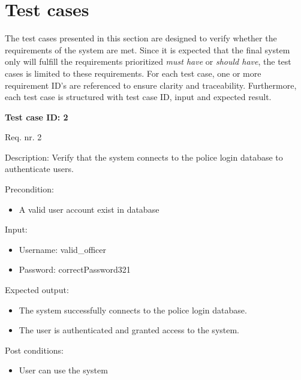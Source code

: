 \section{Test cases}
The test cases presented in this section are designed to verify whether the requirements of the system are met. Since it is expected that the final system only will fulfill the requirements prioritized \textit{must have} or \textit{should have}, the test cases is limited to these requirements. 
For each test case, one or more requirement ID's are referenced to ensure clarity and traceability. Furthermore, each test case is structured with test case ID, input and expected result.\vspace{1em}

\noindent \hrulefill

\vspace{1em}
\noindent\textbf{Test case ID: 2}
\vspace{1em}

\noindent Req. nr. 2
\vspace{1em}

\noindent Description: 
Verify that the system connects to the police login database to authenticate users.\\
\vspace{1em}

\noindent Precondition:
\begin{itemize}
    \item A valid user account exist in database
\end{itemize}
\vspace{1em}

\noindent Input:
\begin{itemize}
    \item Username: valid\_officer
    \item Password: correctPassword321
\end{itemize}
\vspace{1em}

\noindent Expected output:
\begin{itemize}
    \item     The system successfully connects to the police login database.
    \item The user is authenticated and granted access to the system.
\end{itemize}
\vspace{1em}

\noindent Post conditions:
\begin{itemize}
    \item User can use the system
\end{itemize}

